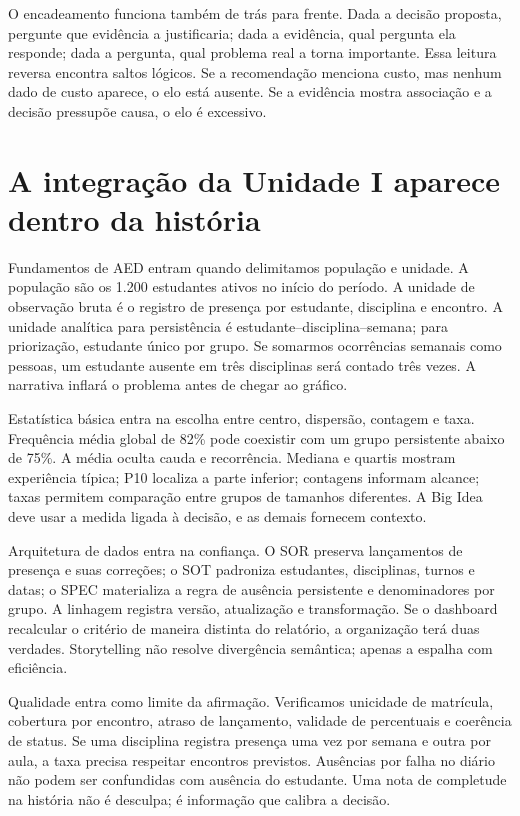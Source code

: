 O encadeamento funciona também de trás para frente. Dada a decisão proposta, pergunte que evidência a justificaria; dada a evidência, qual pergunta ela responde; dada a pergunta, qual problema real a torna importante. Essa leitura reversa encontra saltos lógicos. Se a recomendação menciona custo, mas nenhum dado de custo aparece, o elo está ausente. Se a evidência mostra associação e a decisão pressupõe causa, o elo é excessivo.

\section{A integração da Unidade I aparece dentro da história}

Fundamentos de AED entram quando delimitamos população e unidade. A população são os 1.200 estudantes ativos no início do período. A unidade de observação bruta é o registro de presença por estudante, disciplina e encontro. A unidade analítica para persistência é estudante--disciplina--semana; para priorização, estudante único por grupo. Se somarmos ocorrências semanais como pessoas, um estudante ausente em três disciplinas será contado três vezes. A narrativa inflará o problema antes de chegar ao gráfico.

Estatística básica entra na escolha entre centro, dispersão, contagem e taxa. Frequência média global de 82\% pode coexistir com um grupo persistente abaixo de 75\%. A média oculta cauda e recorrência. Mediana e quartis mostram experiência típica; P10 localiza a parte inferior; contagens informam alcance; taxas permitem comparação entre grupos de tamanhos diferentes. A Big Idea deve usar a medida ligada à decisão, e as demais fornecem contexto.

Arquitetura de dados entra na confiança. O SOR preserva lançamentos de presença e suas correções; o SOT padroniza estudantes, disciplinas, turnos e datas; o SPEC materializa a regra de ausência persistente e denominadores por grupo. A linhagem registra versão, atualização e transformação. Se o dashboard recalcular o critério de maneira distinta do relatório, a organização terá duas verdades. Storytelling não resolve divergência semântica; apenas a espalha com eficiência.

Qualidade entra como limite da afirmação. Verificamos unicidade de matrícula, cobertura por encontro, atraso de lançamento, validade de percentuais e coerência de status. Se uma disciplina registra presença uma vez por semana e outra por aula, a taxa precisa respeitar encontros previstos. Ausências por falha no diário não podem ser confundidas com ausência do estudante. Uma nota de completude na história não é desculpa; é informação que calibra a decisão.

